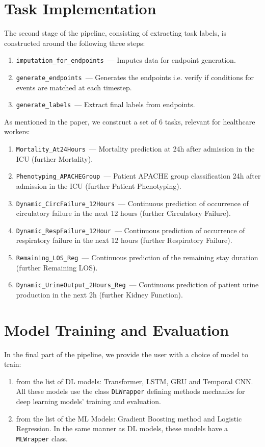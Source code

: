 \documentclass{article}
\begin{document}
\section*{Task Implementation}
The second stage of the pipeline, consisting of extracting task labels, is constructed around the following three steps:
\begin{enumerate}
    \item \texttt{imputation\_for\_endpoints}~--- Imputes data for endpoint generation. 
    \item \texttt{generate\_endpoints}~--- Generates the endpoints i.e. verify if conditions for events are matched at each timestep.
    \item \texttt{generate\_labels}~---  Extract final labels from endpoints.
\end{enumerate}
As mentioned in the paper, we construct a set of 6 tasks, relevant for healthcare workers: 
\begin{enumerate}
\item \texttt{Mortality\_At24Hours}~--- Mortality prediction at 24h after admission in the ICU (further Mortality).
\item \texttt{Phenotyping\_APACHEGroup}~--- Patient APACHE group classification 24h after admission in the ICU (further Patient Phenotyping).
\item  \texttt{Dynamic\_CircFailure\_12Hours}~--- Continuous prediction of occurrence of circulatory failure in the next 12 hours (further Circulatory Failure).
\item \texttt{Dynamic\_RespFailure\_12Hour}~--- Continuous prediction of occurrence of respiratory failure in the next 12 hours (further Respiratory Failure).
\item \texttt{Remaining\_LOS\_Reg}~--- Continuous prediction of the remaining stay duration (further Remaining LOS).
\item \texttt{Dynamic\_UrineOutput\_2Hours\_Reg}~--- Continuous prediction of patient urine production in the next 2h (further Kidney Function).
\end{enumerate}

\section*{Model Training and Evaluation}
In the final part of the pipeline, we provide the user with a choice of model to train: 
\begin{enumerate}
    \item from the list of DL models: Transformer, LSTM, GRU and Temporal CNN. All these models use the class \texttt{DLWrapper} defining methods mechanics for deep learning models' training and evaluation. 
    \item from the list of the ML Models: Gradient Boosting method and Logistic Regression. In the same manner as DL models, these models have a \texttt{MLWrapper} class.
\end{enumerate}
\end{document}
